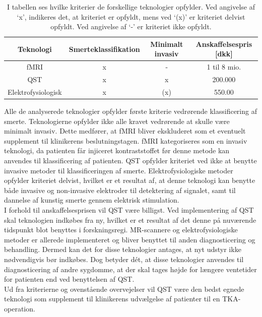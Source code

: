 \begin{table}[H]
	\centering
	\begin{tabular}{cccc}
		\hline
		\rowcolor[HTML]{C0C0C0} 
		Teknologi          & Smerteklassifikation & Minimalt invasiv & Anskaffelsespris  {[}dkk{]} \\ \hline
		fMRI               & x                   & -                & 1 til 8 mio.          \\
		QST                & x                   & x                & 200.000               \\
		Elektrofysiologisk & x                   & (x)              & 550.00                \\ \hline
	\end{tabular}
	\caption{I tabellen ses hvilke kriterier de forskellige teknologier opfylder. Ved angivelse af ‘x’, indikeres det, at kriteriet er opfyldt, mens ved ‘(x)’ er kriteriet delvist opfyldt. Ved angivelse af ‘-’ er kriteriet ikke opfyldt.}
	\label{tab:succeskriterier_metoder}
\end{table} \vspace{-.5cm}
Alle de analyserede teknologier opfylder første kriterie vedrørende klassificering af smerte. Teknologierne opfylder ikke alle kravet vedrørende at skulle være minimalt invasiv. Dette medfører, at fMRI bliver ekskluderet som et eventuelt supplement til klinikerens beslutningstagen. fMRI kategoriseres som en invasiv teknologi, da patienten får injiceret kontraststoffet før denne metode kan anvendes til klassificering af patienten. QST opfylder kriteriet ved ikke at benytte invasive metoder til klassificeringen af smerte. Elektrofysiologiske metoder opfylder kriteriet delvist, hvilket er et resultat af, at denne teknologi kan benytte både invasive og non-invasive elektroder til detektering af signalet, samt til dannelse af kunstig smerte gennem elektrisk stimulation. \\
I forhold til anskaffelsesprisen vil QST være billigst. Ved implementering af QST skal teknologien indkøbes fra ny, hvilket er et resultat af det denne på nuværende tidspunkt blot benyttes i forskningsregi. MR-scannere og elektrofysiologiske metoder er allerede implementeret og bliver benyttet til anden diagnosticering og behandling. Dermed kan det for disse teknologier antages, at nyt udstyr ikke nødvendigvis bør indkøbes. Dog betyder dét, at disse teknologier anvendes til diagnosticering af andre sygdomme, at der skal tages højde for længere ventetider for patienten end ved benyttelsen af QST.\\
Ud fra kriterierne og ovenstående overvejelser vil QST være den bedst egnede teknologi som supplement til klinikerens udvælgelse af patienter til en TKA-operation.  



